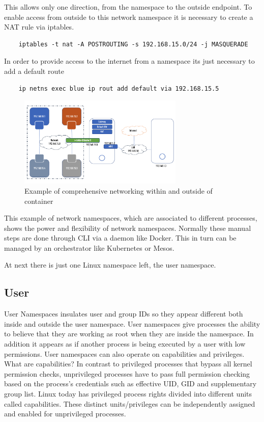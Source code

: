This allows only one direction, from the namespace to the outside endpoint. To enable access from outside to this network namespace it is necessary to create a NAT rule via iptables.

\begin{lstlisting}
	iptables -t nat -A POSTROUTING -s 192.168.15.0/24 -j MASQUERADE	
\end{lstlisting}

In order to provide access to the internet from a namespace its just necessary to add a default route

\begin{lstlisting}
	ip netns exec blue ip rout add default via 192.168.15.5
\end{lstlisting}

\begin{figure}[htbp]
 \centering
 \includegraphics[width=0.7\textwidth]{gfx/examples/network_ns_out}
 \caption{Example of comprehensive networking within and outside of container}
\label{sec:intro:containerization:linux_namespaces:netowork_ns_out}
\end{figure}

This example of network namespaces, which are associated to different processes, shows the power and flexibility of network namespaces.
Normally these manual steps are done through CLI via a daemon like Docker. This in turn can be managed by an orchestrator like Kubernetes or Mesos.

At next there is just one Linux namespace left, the user namespace.

\subsection{User}
\label{sec:intro:containerization:linux_namespaces:user_namespaces}
User Namespaces insulates user and group IDs so they appear different both inside and outside the user namespace.
User namespaces give processes the ability to believe that they are working as root when they are inside the namespace. In addition it appears as if another process is being executed by a user with low permissions.
User namespaces can also operate on capabilities and privileges. 
What are capabilities? In contrast to privileged processes that bypass all kernel permission checks, unprivileged processes have to pass full permission checking based on the process’s credentials such as effective UID, GID and supplementary group list. Linux today has privileged process rights divided into different units called capabilities. These distinct units/privileges can be independently assigned and enabled for unprivileged processes.


